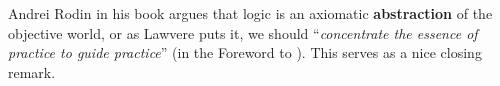 \documentclass[runningheads]{llncs}
\begin{document}
Andrei Rodin in his book \cite{Rodin2014} argues that logic is an axiomatic \textbf{abstraction} of the objective world, or as Lawvere puts it, we should ``\textit{concentrate the essence of practice to guide practice}'' (in the Foreword to \cite{Adamek2011}).  This serves as a nice closing remark.



%
%
%
% 
\printbibliography
\end{document}
